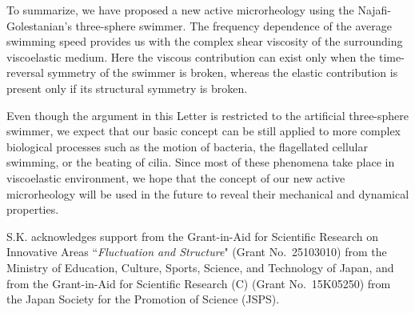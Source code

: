 \documentclass[nofootinbib,twocolumn,showpacs,preprintnumbers,pre,aps]{revtex4-1}
\begin{document}
To summarize, we have proposed a new active microrheology using the 
Najafi-Golestanian's three-sphere swimmer.
The frequency dependence of the average swimming 
speed provides us with the complex shear viscosity of the surrounding 
viscoelastic medium. 
Here the viscous contribution can exist only when the time-reversal symmetry 
of the swimmer is broken, whereas the elastic contribution is present only if its structural 
symmetry is broken. 


Even though the argument in this Letter is restricted to the artificial three-sphere swimmer, 
we expect that our basic concept can be still applied to more complex biological processes 
such as the motion of bacteria, the flagellated cellular swimming, or the beating of cilia. 
Since most of these phenomena take place in viscoelastic environment, we hope that the 
concept of our new active microrheology will be used in the future to reveal their mechanical 
and dynamical properties.


S.K. acknowledges support from the Grant-in-Aid for Scientific Research on
Innovative Areas ``\textit{Fluctuation and Structure}" (Grant No.\ 25103010) from the Ministry
of Education, Culture, Sports, Science, and Technology of Japan, and from 
the Grant-in-Aid for Scientific Research (C) (Grant No.\ 15K05250)
from the Japan Society for the Promotion of Science (JSPS).
\end{document}
